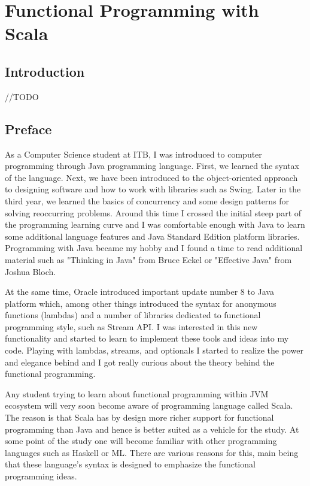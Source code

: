\documentclass[12pt,twoside,a4paper]{report}
\begin{document}
\chapter{Functional Programming with Scala}\label{6}

\section{Introduction}\label{6.1}
//TODO

\section{Preface}\label{6.2}
As a Computer Science student at ITB, I was introduced to computer programming through Java programming language. First, we learned the syntax of the language. Next, we have been introduced to the object-oriented approach to designing software and how to work with libraries such as Swing. Later in the third year, we learned the basics of concurrency and some design patterns for solving reoccurring problems. Around this time I crossed the initial steep part of the programming learning curve and I was comfortable enough with Java to learn some additional language features and Java Standard Edition platform libraries. Programming with Java became my hobby and I found a time to read additional material such as "Thinking in Java" from Bruce Eckel or "Effective Java" from Joshua Bloch.

At the same time, Oracle introduced important update number 8 to Java platform which, among other things introduced the syntax for anonymous functions (lambdas) and a number of libraries dedicated to functional programming style, such as Stream API. I was interested in this new functionality and started to learn to implement these tools and ideas into my code. Playing with lambdas, streams, and optionals I started to realize the power and elegance behind and I got really curious about the theory behind the functional programming.

Any student trying to learn about functional programming within JVM ecosystem will very soon become aware of programming language called Scala. The reason is that Scala has by design more richer support for functional programming than Java and hence is better suited as a vehicle for the study. At some point of the study one will become familiar with other programming languages such as Haskell or ML. There are various reasons for this, main being that these language's syntax is designed to emphasize the functional programming ideas.
\end{document}
